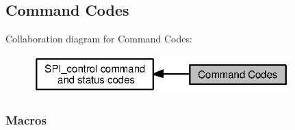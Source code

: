 \subsection{Command Codes}
\label{group___s_p_i___c_m_d}
Collaboration diagram for Command Codes\+:
\nopagebreak
\begin{figure}[H]
\begin{center}
\leavevmode
\includegraphics[width=281pt]{group___s_p_i___c_m_d}
\end{center}
\end{figure}
\subsubsection*{Macros}
